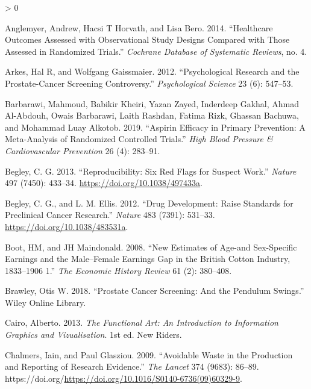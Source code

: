 \documentclass[
  10pt,
  b5paper]{book}
\newlength{\cslhangindent}
\newenvironment{CSLReferences}[2] %
 {%
  \setlength{\parindent}{0pt}
  \ifodd #1 \everypar{\setlength{\hangindent}{\cslhangindent}}\ignorespaces\fi
  \ifnum #2 > 0
  \setlength{\parskip}{#2\baselineskip}
  \fi
 }%
 {}
\begin{document}
\hypertarget{refs}{}
\begin{CSLReferences}{1}{0}
\leavevmode\hypertarget{ref-anglemyer2014healthcare}{}%
Anglemyer, Andrew, Hacsi T Horvath, and Lisa Bero. 2014. {``Healthcare Outcomes Assessed with Observational Study Designs Compared with Those Assessed in Randomized Trials.''} \emph{Cochrane Database of Systematic Reviews}, no. 4.

\leavevmode\hypertarget{ref-arkes2012psychological}{}%
Arkes, Hal R, and Wolfgang Gaissmaier. 2012. {``Psychological Research and the Prostate-Cancer Screening Controversy.''} \emph{Psychological Science} 23 (6): 547--53.

\leavevmode\hypertarget{ref-barbarawi2019aspirin}{}%
Barbarawi, Mahmoud, Babikir Kheiri, Yazan Zayed, Inderdeep Gakhal, Ahmad Al-Abdouh, Owais Barbarawi, Laith Rashdan, Fatima Rizk, Ghassan Bachuwa, and Mohammad Luay Alkotob. 2019. {``Aspirin Efficacy in Primary Prevention: A Meta-Analysis of Randomized Controlled Trials.''} \emph{High Blood Pressure \& Cardiovascular Prevention} 26 (4): 283--91.

\leavevmode\hypertarget{ref-r2_begley_2013}{}%
Begley, C. G. 2013. {``Reproducibility: Six Red Flags for Suspect Work.''} \emph{Nature} 497 (7450): 433--34. \url{https://doi.org/10.1038/497433a}.

\leavevmode\hypertarget{ref-r23_begley_ellis_2012}{}%
Begley, C. G., and L. M. Ellis. 2012. {``Drug Development: Raise Standards for Preclinical Cancer Research.''} \emph{Nature} 483 (7391): 531--33. \url{https://doi.org/10.1038/483531a}.

\leavevmode\hypertarget{ref-boot2008new}{}%
Boot, HM, and JH Maindonald. 2008. {``New Estimates of Age-and Sex-Specific Earnings and the Male--Female Earnings Gap in the British Cotton Industry, 1833--1906 1.''} \emph{The Economic History Review} 61 (2): 380--408.

\leavevmode\hypertarget{ref-brawley2018prostate}{}%
Brawley, Otis W. 2018. {``Prostate Cancer Screening: And the Pendulum Swings.''} Wiley Online Library.

\leavevmode\hypertarget{ref-cairo_2013}{}%
Cairo, Alberto. 2013. \emph{The Functional Art: An Introduction to Information Graphics and Vizualisation}. 1st ed. New Riders.

\leavevmode\hypertarget{ref-chalmers2009avoidable}{}%
Chalmers, Iain, and Paul Glasziou. 2009. {``Avoidable Waste in the Production and Reporting of Research Evidence.''} \emph{The Lancet} 374 (9683): 86--89. https://doi.org/\url{https://doi.org/10.1016/S0140-6736(09)60329-9}.


\end{CSLReferences}
\end{document}
